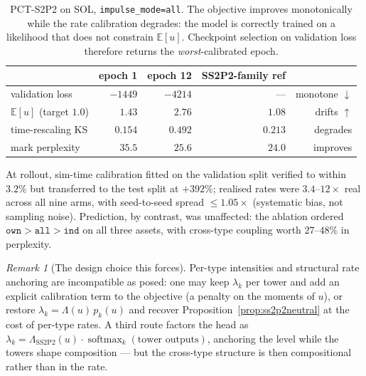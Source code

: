 \documentclass[11pt]{article}
\theoremstyle{remark}
\newtheorem{remark}{Remark}
\newcommand{\E}{\mathbb{E}}
\begin{document}
\begin{table}[h]
\centering
\begin{tabular}{lrrrr}
\toprule
& epoch 1 & epoch 12 & SS2P2-family ref & \\
\midrule
validation loss & $-1449$ & $-4214$ & --- & monotone $\downarrow$\\
$\E[u]$ (target $1.0$) & $1.43$ & $2.76$ & $1.08$ & drifts $\uparrow$\\
time-rescaling KS & $0.154$ & $0.492$ & $0.213$ & degrades\\
mark perplexity & $35.5$ & $25.6$ & $24.0$ & improves\\
\bottomrule
\end{tabular}
\caption{PCT-S2P2 on SOL, \texttt{impulse\_mode=all}. The objective improves
monotonically while the rate calibration degrades: the model is correctly
trained on a likelihood that does not constrain $\E[u]$. Checkpoint selection
on validation loss therefore returns the \emph{worst}-calibrated epoch.}
\end{table}

At rollout, sim-time calibration fitted on the validation split verified to
within $3.2\%$ but transferred to the test split at $+392\%$; realised rates
were $3.4$--$12\times$ real across all nine arms, with seed-to-seed spread
$\le 1.05\times$ (systematic bias, not sampling noise). Prediction, by
contrast, was unaffected: the ablation ordered
$\texttt{own} > \texttt{all} > \texttt{ind}$ on all three assets, with
cross-type coupling worth $27$--$48\%$ in perplexity.

\begin{remark}[The design choice this forces]
Per-type intensities and structural rate anchoring are incompatible as posed:
one may keep $\lambda_k$ per tower and add an explicit calibration term to the
objective (a penalty on the moments of $u$), or restore
$\lambda_k = \Lambda(u)\,p_k(u)$ and recover
Proposition~\ref{prop:ss2p2neutral} at the cost of per-type rates. A third
route factors the head as
$\lambda_k = \Lambda_{\mathrm{SS2P2}}(u)\cdot\operatorname{softmax}_k(\text{tower outputs})$,
anchoring the level while the towers shape composition --- but the cross-type
structure is then compositional rather than in the rate.
\end{remark}
\end{document}
